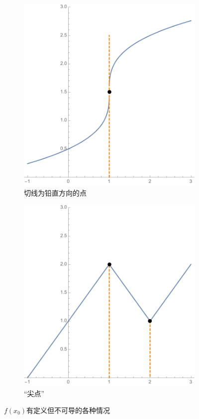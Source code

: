 \begin{figure}[h]
\begin{subfigure}[t]{0.3\textwidth}
		\includegraphics[width=\textwidth]
		{./images/ch02/vertTouch.pdf}
		\caption{切线为铅直方向的点}
	\end{subfigure}\;\;
	\begin{subfigure}[t]{0.3\textwidth}
		\centering
		\includegraphics[width=\textwidth]
		{./images/ch02/sharpCor.pdf}
		\caption{“尖点”}
	\end{subfigure}
	\caption{$f(x_0)$有定义但不可导的各种情况}
	\label{fig:nonDeriv}
\end{figure}
\fi

